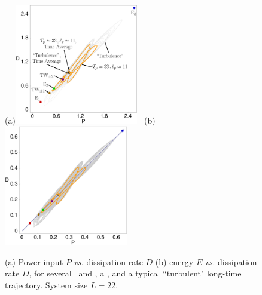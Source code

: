 

\begin{figure}[t]
\begin{center}
(a)\!\!\!\!\includegraphics[width=0.48\textwidth]{figs/energyBalance_pst.eps}%
~(b)\!\!\!\!\includegraphics[width=0.48\textwidth]{figs/energyBalancePlot.eps}
\end{center}
\caption{
(a) Power input $P$ {\em vs.}
dissipation rate $D$ 
(b) energy $E$  {\em vs.}
dissipation rate $D$,   for several  \eqva\ and \reqva,
a \rpo , and a typical ``turbulent" long-time trajectory.
System size $L=22$.
        }
\label{f:drivedrag}
\end{figure}

